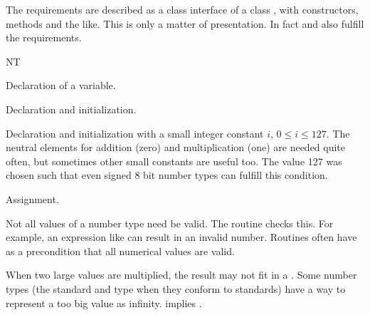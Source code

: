 The requirements are described as a class interface of a class , 
with constructors, methods and the like. 
This is only a matter of presentation.  
In fact  and  also fulfill the requirements.

\begin{ccClass} {NT}
\ccSetTwoColumns{}{\hspace*{8.5cm}}
\ccCreation
{}

            {Declaration of a variable.}


            {Declaration and initialization.}


            {Declaration and initialization with a small integer
constant $i$, $0 \leq i \leq 127$. The neutral elements for addition
(zero) and multiplication (one) are needed quite often, but sometimes
other small constants are useful too. The value 127 was chosen such
that even signed 8 bit number types can fulfill this condition.  }

\ccOperations
{}
        {Assignment.  }


{Not all values of a number type need be valid. The routine
 checks this. For example, an expression like
 can result in an invalid number. Routines often
have as a precondition that all numerical values are valid.}

{ When two large values are multiplied, the result may not fit in a
  . 
  Some number types (the standard  and  type
  when they conform to standards) have a way to represent a too big
  value as infinity.   implies .}

       {}
\ccGlue
{}
       {}
\ccGlue
{}
       {}
\ccGlue
{}
       {}
\ccGlue
{}
       {}
\ccGlue
{}
       {}
\ccGlue
{}
       {}
\ccGlue
{}
       {}
\ccGlue
{}
       {}
\ccGlue
{}
       {}
\ccGlue
{}
       {}
\ccGlue
{}
       {}
\ccGlue
{}
       {}


\end{ccClass}
